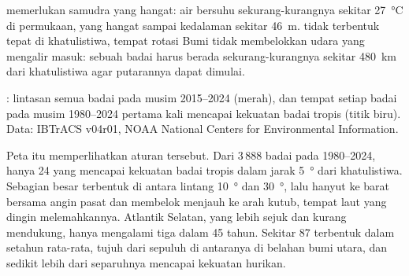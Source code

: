  memerlukan samudra yang hangat: air bersuhu sekurang-kurangnya
sekitar \qty{27}{\degreeCelsius} di permukaan, yang hangat sampai kedalaman
sekitar \qty{46}{m}.  tidak terbentuk tepat di khatulistiwa,
tempat rotasi Bumi tidak membelokkan udara yang mengalir masuk: sebuah badai
harus berada sekurang-kurangnya sekitar \qty{480}{km} dari khatulistiwa agar
putarannya dapat dimulai.

\begin{omfigure}

{\small {}: lintasan semua badai pada musim 2015--2024 (merah), dan
tempat setiap badai pada musim 1980--2024 pertama kali mencapai kekuatan badai
tropis (titik biru). Data: IBTrACS v04r01, NOAA National Centers for
Environmental Information.}
\end{omfigure}

Peta itu memperlihatkan aturan tersebut. Dari 3\,888 badai pada 1980--2024,
hanya 24 yang mencapai kekuatan badai tropis dalam jarak \qty{5}{\degree} dari
khatulistiwa. Sebagian besar terbentuk di antara lintang \qty{10}{\degree} dan
\qty{30}{\degree}, lalu hanyut ke barat bersama angin pasat dan membelok
menjauh ke arah kutub, tempat laut yang dingin melemahkannya. Atlantik
Selatan, yang lebih sejuk dan kurang mendukung, hanya mengalami tiga dalam 45
tahun. Sekitar 87  terbentuk dalam setahun rata-rata, tujuh dari
sepuluh di antaranya di belahan bumi utara, dan sedikit lebih dari separuhnya
mencapai kekuatan hurikan.

